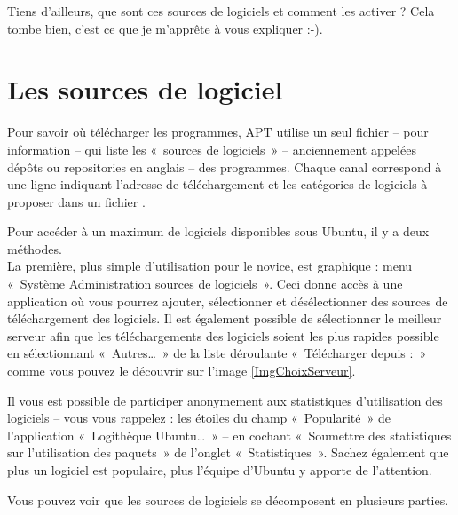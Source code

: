 {\begin{nota}
Tiens d'ailleurs, que sont ces sources de logiciels et comment les activer ? Cela tombe bien, c'est ce que je m'apprête à vous expliquer :-).
\end{nota}
\section{Les sources de logiciel}
\label{RefSourceMAJ}
Pour savoir où télécharger les programmes, APT utilise un seul fichier --  pour information -- qui liste les «~sources de logiciels~» -- anciennement appelées dépôts ou repositories en anglais -- des programmes. Chaque canal correspond à une ligne indiquant l'adresse de téléchargement et les catégories de logiciels à proposer dans un fichier .\par
Pour accéder à un maximum de logiciels disponibles sous Ubuntu, il y a deux méthodes.\\
La première, plus simple d'utilisation pour le novice, est graphique : menu «~Système \FlecheDroite Administration \FlecheDroite sources de logiciels~». Ceci donne accès à une application où vous pourrez ajouter, sélectionner et désélectionner des sources de téléchargement des logiciels. Il est également possible de sélectionner le meilleur serveur afin que les téléchargements des logiciels soient les plus rapides possible en sélectionnant «~Autres\ldots{}~» de la liste déroulante «~Télécharger depuis :~» comme vous pouvez le découvrir sur l'image \ref{ImgChoixServeur}.\par
{}
\begin{nota}
Il vous est possible de participer anonymement aux statistiques d'utilisation des logiciels -- vous vous rappelez : les étoiles du champ «~Popularité~» de l'application «~Logithèque Ubuntu\dots{}~» -- en cochant «~Soumettre des statistiques sur l'utilisation des paquets~» de l'onglet «~Statistiques~». Sachez également que plus un logiciel est populaire, plus l'équipe d'Ubuntu y apporte de l'attention.
\end{nota}
Vous pouvez voir que les sources de logiciels se décomposent en plusieurs parties.
}
